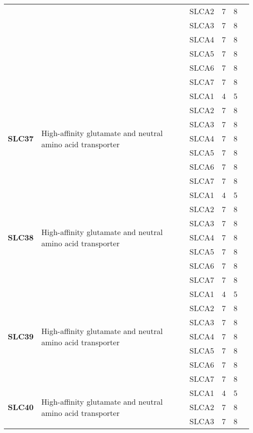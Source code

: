 \documentclass[12pt]{report}
\begin{document}
\begin{center}
\begin{longtable}{|p{1.5cm}|p{3.2cm}|p{1.9cm}|p{1.65cm}|p{3cm}|p{3cm}|}
\cline{3-6}
&&SLCA2&7 & 8&\\ 
\cline{3-6}
&&SLCA3&7 & 8&\\ 
\cline{3-6}
&&SLCA4&7 & 8&\\ 
\cline{3-6}
&&SLCA5&7 & 8&\\ 
\cline{3-6}
&&SLCA6&7 & 8&\\ 
\cline{3-6}
&&SLCA7&7 & 8&\\ 
\hline
\multirow{7}{1.5cm}{\textbf{SLC37}} & \multirow{7}{4cm}{High-affinity glutamate and neutral amino acid transporter} & SLCA1 & 4 & 5\\ 
\cline{3-6}
&&SLCA2&7 & 8&\\ 
\cline{3-6}
&&SLCA3&7 & 8&\\ 
\cline{3-6}
&&SLCA4&7 & 8&\\ 
\cline{3-6}
&&SLCA5&7 & 8&\\ 
\cline{3-6}
&&SLCA6&7 & 8&\\ 
\cline{3-6}
&&SLCA7&7 & 8&\\ 
\hline
\multirow{7}{1.5cm}{\textbf{SLC38}} & \multirow{7}{4cm}{High-affinity glutamate and neutral amino acid transporter} & SLCA1 & 4 & 5\\ 
\cline{3-6}
&&SLCA2&7 & 8&\\ 
\cline{3-6}
&&SLCA3&7 & 8&\\ 
\cline{3-6}
&&SLCA4&7 & 8&\\ 
\cline{3-6}
&&SLCA5&7 & 8&\\ 
\cline{3-6}
&&SLCA6&7 & 8&\\ 
\cline{3-6}
&&SLCA7&7 & 8&\\ 
\hline
\multirow{7}{1.5cm}{\textbf{SLC39}} & \multirow{7}{4cm}{High-affinity glutamate and neutral amino acid transporter} & SLCA1 & 4 & 5\\ 
\cline{3-6}
&&SLCA2&7 & 8&\\ 
\cline{3-6}
&&SLCA3&7 & 8&\\ 
\cline{3-6}
&&SLCA4&7 & 8&\\ 
\cline{3-6}
&&SLCA5&7 & 8&\\ 
\cline{3-6}
&&SLCA6&7 & 8&\\ 
\cline{3-6}
&&SLCA7&7 & 8&\\ 
\hline
\multirow{7}{1.5cm}{\textbf{SLC40}} & \multirow{7}{4cm}{High-affinity glutamate and neutral amino acid transporter} & SLCA1 & 4 & 5\\ 
\cline{3-6}
&&SLCA2&7 & 8&\\ 
\cline{3-6}
&&SLCA3&7 & 8&\\ 

\end{longtable}
\end{center}
\end{document}
